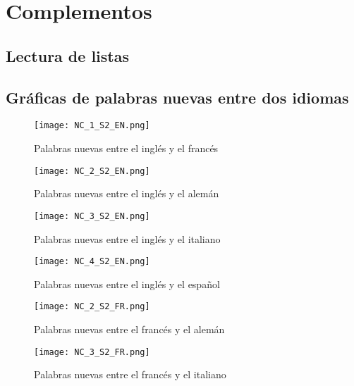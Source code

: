 \chapter{Complementos}

\section{Lectura de listas}
\label{lectura.listas}


\newpage

\section{Gráficas de palabras nuevas entre dos idiomas}
\label{palabras.nuevas.apendice}

\begin{figure}[h!]
	\centering
	\texttt{[image: NC\_1\_S2\_EN.png]}
	\label{fig.NC_EF}
	\caption{Palabras nuevas entre el inglés y el francés}
\end{figure}

\begin{figure}[h!]
	\centering
	\texttt{[image: NC\_2\_S2\_EN.png]}
	\label{fig.NC_EG}
	\caption{Palabras nuevas entre el inglés y el alemán}
\end{figure}

\begin{figure}[h!]
	\centering
	\texttt{[image: NC\_3\_S2\_EN.png]}
	\label{fig.NC_EI}
	\caption{Palabras nuevas entre el inglés y el italiano}
\end{figure}


\begin{figure}[h!]
	\centering
	\texttt{[image: NC\_4\_S2\_EN.png]}
	\label{fig.NC_ES}
	\caption{Palabras nuevas entre el inglés y el español}
\end{figure}

\begin{figure}[h!]
	\centering
	\texttt{[image: NC\_2\_S2\_FR.png]}
	\label{fig.NC_FG}
	\caption{Palabras nuevas entre el francés y el alemán}
\end{figure}


\begin{figure}[h!]
	\centering
	\texttt{[image: NC\_3\_S2\_FR.png]}
	\label{fig.NC_FI}
	\caption{Palabras nuevas entre el francés y el italiano}
\end{figure}

